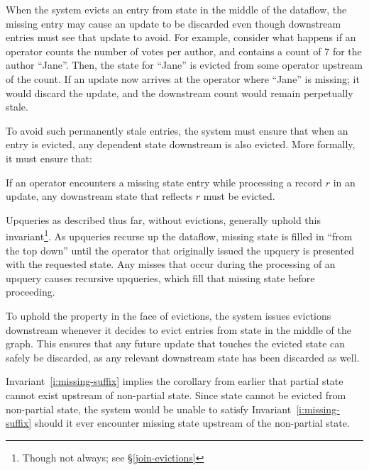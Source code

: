 When the system evicts an entry from state in the middle of the dataflow, the
missing entry may cause an update to be discarded even though downstream entries
must see that update to avoid. For example, consider what happens if an operator
counts the number of votes per author, and contains a count of 7 for the author
``Jane''. Then, the state for ``Jane'' is evicted from some operator upstream of
the count. If an update now arrives at the operator where ``Jane'' is missing;
it would discard the update, and the downstream count would remain perpetually
stale.

To avoid such permanently stale entries, the system must ensure that when an
entry is evicted, any dependent state downstream is also evicted. More formally,
it must ensure that:

\begin{invariant}
  \label{i:missing-suffix}
  If an operator encounters a missing state entry while processing a record $r$
  in an update, any downstream state that reflects $r$ must be evicted.
\end{invariant}

Upqueries as described thus far, without evictions, generally uphold this
invariant\footnote{Though not always; see \S\ref{join-evictions}}. As upqueries
recurse up the dataflow, missing state is filled in ``from the top down'' until
the operator that originally issued the upquery is presented with the requested
state. Any misses that occur during the processing of an upquery causes
recursive upqueries, which fill that missing state before proceeding.

To uphold the property in the face of evictions, the system issues evictions
downstream whenever it decides to evict entries from state in the middle of the
graph. This ensures that any future update that touches the evicted state can
safely be discarded, as any relevant downstream state has been discarded as
well.

Invariant~\ref{i:missing-suffix} implies the corollary from earlier that partial
state cannot exist upstream of non-partial state. Since state cannot be evicted
from non-partial state, the system would be unable to satisfy
Invariant~\ref{i:missing-suffix} should it ever encounter missing state upstream
of the non-partial state.
